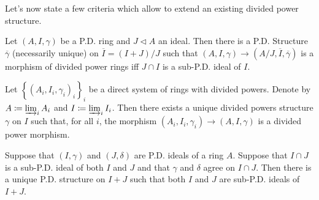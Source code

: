 \noindent
Let's now state a few criteria which allow to extend an existing divided power structure.
\begin{lem}\label{QuotientDividedPowers}
	Let $\left(A, I, \gamma\right)$ be a P.D. ring and $J \triangleleft A$ an ideal.
	Then there is a P.D. Structure \(\overline{\gamma}\) (necessarily unique)
	on \(\overline{I} = (I+J)/J\) such that
	\(\left(A, I, \gamma\right) \to \left(A/J, \overline{I}, \overline{\gamma}\right)\)
	is a morphism of divided power rings iff
	\(J \cap I\) is a sub-P.D. ideal of \(I\).
\end{lem}


\begin{lem}\label{CompletidonPDStructure}
	Let \(\left\{ \left(A_i, I_i, \gamma_i\right)_{ i } \right\}_{ i }\)
	be a direct system of rings with divided powers.
	Denote by \(A \coloneqq \varinjlim_{ i } A_i\)
	and \(I \coloneqq \varinjlim_{ i } I_i\).
	Then there exists a unique divided powers structure \(\gamma\) on \(I\)
	such that, for all \(i\), the morphism
	\(\left(A_i, I_i, \gamma_i\right) \to \left(A, I, \gamma\right)\)
	is a divided power morphism.
\end{lem}




\begin{prop}\label{lem:PDExt2}
	Suppose that $\left(I, \gamma\right)$ and $\left(J, \delta\right)$ are
	P.D. ideals of a ring $A$.
	Suppose that $I \cap J$ is a sub-P.D. ideal of both
	$I$ and $J$ and that $\gamma$ and $\delta$ agree on
	$I \cap J$.
	Then there is a unique P.D. structure on $I+J$
	such that both $I$ and $J$ are sub-P.D. ideals of $I+J$.
\end{prop}


